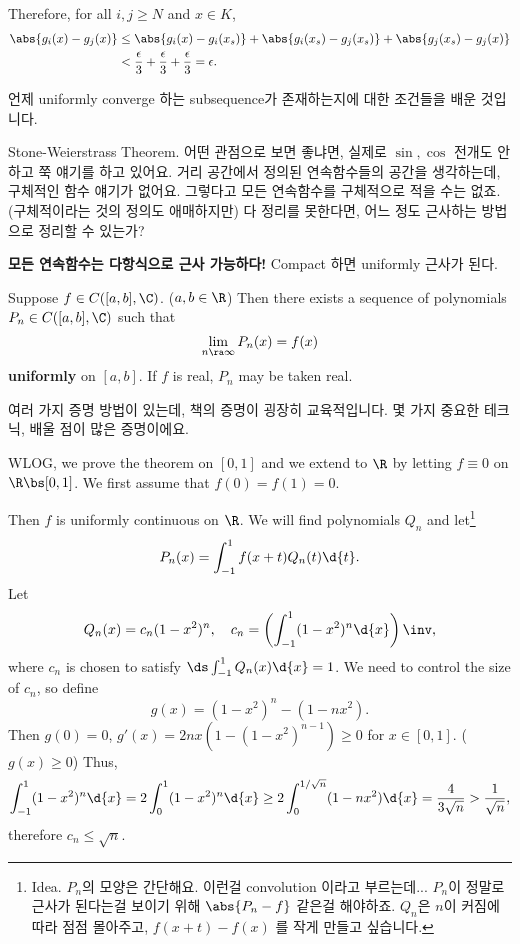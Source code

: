Therefore, for all \(i, j \geq N\) and \(x \in K\),
\[
    \begin{aligned}
        \abs{g_i(x) - g_j(x)} & \leq \abs{g_i(x) - g_i(x_s)} + \abs{g_i(x_s) - g_j(x_s)} + \abs{g_j(x_s) - g_j(x)} \\
                              & < \frac{\epsilon}{3} + \frac{\epsilon}{3} + \frac{\epsilon}{3} = \epsilon.
    \end{aligned}
\]

언제 uniformly converge 하는 subsequence가 존재하는지에 대한 조건들을 배운 것입니다.

Stone-Weierstrass Theorem. 어떤 관점으로 보면 좋냐면, 실제로 \(\sin, \cos\) 전개도 안하고 쭉 얘기를 하고 있어요. 거리 공간에서 정의된 연속함수들의 공간을 생각하는데, 구체적인 함수 얘기가 없어요. 그렇다고 모든 연속함수를 구체적으로 적을 수는 없죠. (구체적이라는 것의 정의도 애매하지만) 다 정리를 못한다면, 어느 정도 근사하는 방법으로 정리할 수 있는가?

\textbf{모든 연속함수는 다항식으로 근사 가능하다!} Compact 하면 uniformly 근사가 된다.

  Suppose \(f \in C([a, b], \C)\). (\(a, b\in \R\)) Then there exists a sequence of polynomials \(P_n \in C([a, b], \C)\) such that
\[
    \lim_{n \ra \infty} P_n(x) = f(x)
\]
\textbf{uniformly} on \([a, b]\). If \(f\) is real, \(P_n\) may be taken real.

여러 가지 증명 방법이 있는데, 책의 증명이 굉장히 교육적입니다. 몇 가지 중요한 테크닉, 배울 점이 많은 증명이에요.

\pf WLOG, we prove the theorem on \([0, 1]\) and we extend to \(\R\) by letting \(f \equiv 0\) on \(\R \bs [0, 1]\). We first assume that \(f(0) = f(1) = 0\).

Then \(f\) is uniformly continuous on \(\R\). We will find polynomials \(Q_n\) and let\footnote{Idea. \(P_n\)의 모양은 간단해요. 이런걸 convolution 이라고 부르는데... \(P_n\)이 정말로 근사가 된다는걸 보이기 위해 \(\abs{P_n - f}\) 같은걸 해야하죠. \(Q_n\)은 \(n\)이 커짐에 따라 점점 몰아주고, \(f(x + t) - f(x)\) 를 작게 만들고 싶습니다.}
\[
    P_n(x) = \int_{-1}^1 f(x+t) Q_n(t) \d{t}.
\]
Let
\[
    Q_n(x) = c_n(1-x^2)^n, \quad c_n = \left(\int_{-1}^1 (1-x^2)^n \d{x}\right)\inv,
\]
where \(c_n\) is chosen to satisfy \(\ds \int_{-1}^1 Q_n(x) \d{x} = 1\). We need to control the size of \(c_n\), so define
\[
    g(x) = (1-x^2)^n - (1-nx^2).
\]
Then \(g(0) = 0\), \(g'(x) = 2nx(1 - (1-x^2)^{n-1})\geq 0\) for \(x \in [0, 1]\). (\(g(x) \geq 0\)) Thus,
\[
    \int_{-1}^1 (1-x^2)^n \d{x} = 2\int_0^1 (1-x^2)^n \d{x} \geq 2 \int_0^{1/\sqrt{n}} (1 - nx^2) \d{x} = \frac{4}{3\sqrt{n}} > \frac{1}{\sqrt{n}},
\]
therefore \(c_n \leq \sqrt{n}\).


